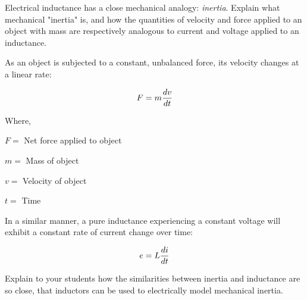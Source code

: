 

Electrical inductance has a close mechanical analogy: {\it inertia}.  Explain what mechanical "inertia" is, and how the quantities of velocity and force applied to an object with mass are respectively analogous to current and voltage applied to an inductance.







As an object is subjected to a constant, unbalanced force, its velocity changes at a linear rate:

$$F = m{dv \over dt}$$

\noindent
Where,

$F = $ Net force applied to object

$m = $ Mass of object

$v = $ Velocity of object

$t = $ Time

\vskip 10pt

In a similar manner, a pure inductance experiencing a constant voltage will exhibit a constant rate of current change over time:

$$e = L{di \over dt}$$

\vskip 10pt







Explain to your students how the similarities between inertia and inductance are so close, that inductors can be used to electrically model mechanical inertia.




